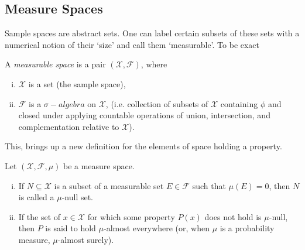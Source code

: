 \subsection{Measure Spaces}
Sample spaces are abstract sets. One can label certain subsets of these sets with a numerical notion of their `size' and call them `measurable'. To be exact  
\begin{defn}
	A \textit{measurable space} is a pair $(\mathscr{X}, \mathscr{F})$, where
	\begin{enumerate}[i.]
		\item $\mathscr{X}$ is a set (the sample space),
		\item $\mathscr{F}$ is a $\sigma-algebra$ on $\mathscr{X}$, (i.e. collection of subsets of $\mathscr{X}$ containing $\phi$ and closed under applying
countable operations of union, intersection, and complementation relative to $\mathscr{X}$).
	\end{enumerate}
\end{defn}
This, brings up a new definition for the elements of space holding a property. 
\begin{defn}
	Let $(\mathscr{X}, \mathscr{F}, \mu)$ be a measure space.
	\begin{enumerate}[i.]
		\item If $N \subseteq \mathscr{X}$ is a subset of a measurable set $E \in \mathscr{F}$ such that $\mu(E) = 0$, then $N$ is called
a $\mu$-null set.
		\item If the set of $x \in \mathscr{X}$ for which some property $P(x)$ does not hold is $\mu$-null, then $P$ is said
to hold $\mu$-almost everywhere (or, when $\mu$ is a probability measure, $\mu$-almost surely).
	\end{enumerate}
\end{defn}
